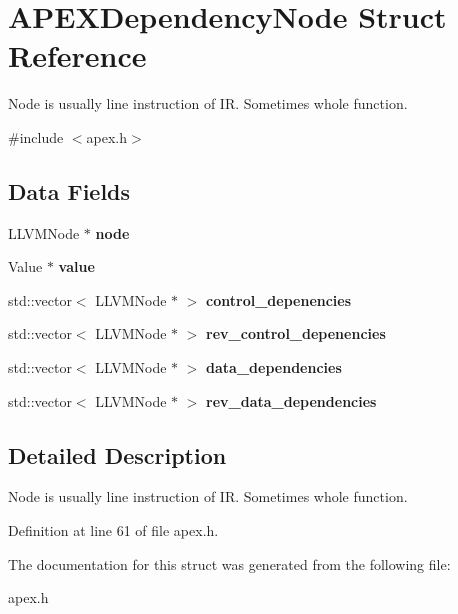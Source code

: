 \section{A\+P\+E\+X\+Dependency\+Node Struct Reference}
\label{structAPEXDependencyNode}


Node is usually line instruction of IR. Sometimes whole function.  




{\ttfamily \#include $<$apex.\+h$>$}

\subsection*{Data Fields}
\begin{DoxyCompactItemize}
\item 
\mbox{\label{structAPEXDependencyNode_a970e7a2fef904e104bff4c2fc5ff2cb1}} 
L\+L\+V\+M\+Node $\ast$ {\bfseries node}
\item 
\mbox{\label{structAPEXDependencyNode_a8b3b641572bf365c4f731fc83b169984}} 
Value $\ast$ {\bfseries value}
\item 
\mbox{\label{structAPEXDependencyNode_a6c402ac3d515fb024c9d8e08aced4f5c}} 
std\+::vector$<$ L\+L\+V\+M\+Node $\ast$ $>$ {\bfseries control\+\_\+depenencies}
\item 
\mbox{\label{structAPEXDependencyNode_ae526db6103f708c8cfacbb0af242c65f}} 
std\+::vector$<$ L\+L\+V\+M\+Node $\ast$ $>$ {\bfseries rev\+\_\+control\+\_\+depenencies}
\item 
\mbox{\label{structAPEXDependencyNode_ade99c6315545e206d562789348540cc0}} 
std\+::vector$<$ L\+L\+V\+M\+Node $\ast$ $>$ {\bfseries data\+\_\+dependencies}
\item 
\mbox{\label{structAPEXDependencyNode_abcf07bec655009d666e6f2c1163f4dcb}} 
std\+::vector$<$ L\+L\+V\+M\+Node $\ast$ $>$ {\bfseries rev\+\_\+data\+\_\+dependencies}
\end{DoxyCompactItemize}


\subsection{Detailed Description}
Node is usually line instruction of IR. Sometimes whole function. 

Definition at line 61 of file apex.\+h.



The documentation for this struct was generated from the following file\+:\begin{DoxyCompactItemize}
\item 
apex.\+h\end{DoxyCompactItemize}
